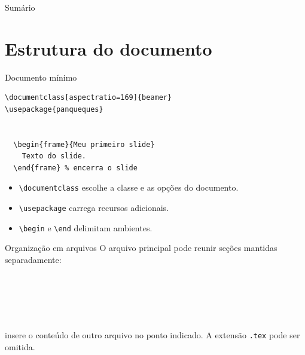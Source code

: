 \begin{frame}{Sumário}
    \tableofcontents
\end{frame}

\section{Estrutura do documento}

\begin{frame}[fragile]{Documento mínimo}
\begin{lstlisting}
\documentclass[aspectratio=169]{beamer}
\usepackage{panqueques}


  \begin{frame}{Meu primeiro slide}
    Texto do slide.
  \end{frame} % encerra o slide

\end{lstlisting}

\begin{itemize}
    \item \verb|\documentclass| escolhe a classe e as opções do documento.
    \item \verb|\usepackage| carrega recursos adicionais.
    \item \verb|\begin| e \verb|\end| delimitam ambientes.
\end{itemize}
\end{frame}

\begin{frame}[fragile]{Organização em arquivos}
O arquivo principal pode reunir seções mantidas separadamente:

\begin{lstlisting}

  
  
  

\end{lstlisting}

\verb|| insere o conteúdo de outro arquivo no ponto indicado. A extensão \texttt{.tex} pode ser omitida.
\end{frame}

